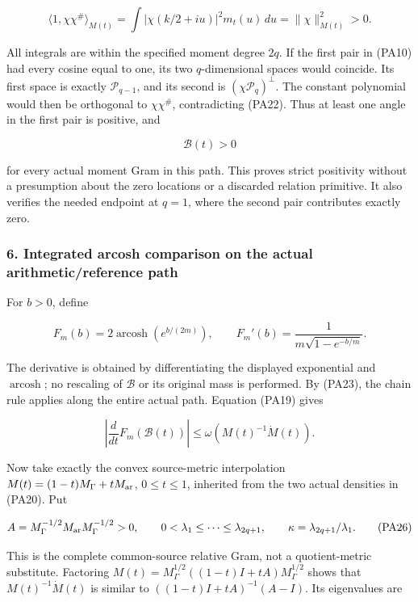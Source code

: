 \[
\langle1,\chi\chi^\#\rangle_{M(t)}
=\int|\chi(k/2+iu)|^2m_t(u)\,du
=\|\chi\|_{M(t)}^2>0.
\tag{PA22}
\]

All integrals are within the specified moment degree \(2q\). If the first pair in (PA10) had every cosine equal to one, its two \(q\)-dimensional spaces would coincide. Its first space is exactly \(\mathcal P_{q-1}\), and its second is \((\chi\mathcal P_q)^\perp\). The constant polynomial would then be orthogonal to \(\chi\chi^\#\), contradicting (PA22). Thus at least one angle in the first pair is positive, and

\[
\boxed{\mathcal B(t)>0}
\tag{PA23}
\]

for every actual moment Gram in this path. This proves strict positivity without a presumption about the zero locations or a discarded relation primitive. It also verifies the needed endpoint at \(q=1\), where the second pair contributes exactly zero.

\subsubsection{6. Integrated arcosh comparison on the actual arithmetic/reference path}\label{endpoint-principal_angle_volume_review--integrated-arcosh-comparison-on-the-actual-arithmeticreference-path}

For \(b>0\), define

\[
F_m(b)=2\operatorname{arcosh}(e^{b/(2m)}),
\qquad
F_m'(b)=\frac{1}{m\sqrt{1-e^{-b/m}}}.
\tag{PA24}
\]

The derivative is obtained by differentiating the displayed exponential and \(\operatorname{arcosh}\); no rescaling of \(\mathcal B\) or its original mass is performed. By (PA23), the chain rule applies along the entire actual path. Equation (PA19) gives

\[
\left|\frac{d}{dt}F_m(\mathcal B(t))\right|
\le\omega(M(t)^{-1}\dot M(t)).
\tag{PA25}
\]

Now take exactly the convex source-metric interpolation \(M(t)=(1-t)M_\Gamma+tM_{\rm ar}\), \(0\le t\le1\), inherited from the two actual densities in (PA20). Put

\[
A=M_\Gamma^{-1/2}M_{\rm ar}M_\Gamma^{-1/2}>0,
\qquad 0<\lambda_1\le\cdots\le\lambda_{2q+1},
\qquad \kappa=\lambda_{2q+1}/\lambda_1.
\tag{PA26}
\]

This is the complete common-source relative Gram, not a quotient-metric substitute. Factoring \(M(t)=M_\Gamma^{1/2}((1-t)I+tA)M_\Gamma^{1/2}\) shows that \(M(t)^{-1}\dot M(t)\) is similar to \(((1-t)I+tA)^{-1}(A-I)\). Its eigenvalues are

